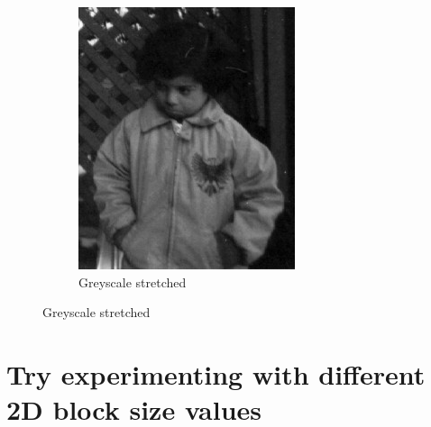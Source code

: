\documentclass{article}
\begin{document}
\begin{itemize}
\begin{figure}[h]
\begin{subfigure}{.45\textwidth}
        \includegraphics[width=\linewidth]{./result/labwork7-gpu-out.jpg}
        \caption{Greyscale stretched}
      \end{subfigure}
    \end{figure}
\end{itemize}
\section{Try experimenting with different 2D block size values}
\end{document}

